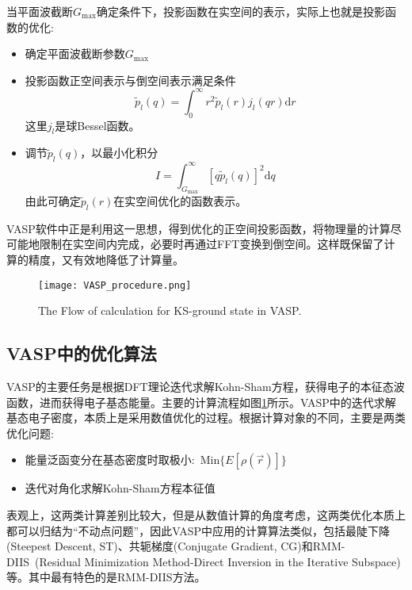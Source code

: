 当平面波截断$G_{\mathrm{max}}$确定条件下，投影函数在实空间的表示，实际上也就是投影函数的优化:~
\begin{itemize}
	\item 确定平面波截断参数$G_{\mathrm{max}}$
	\item 投影函数正空间表示与倒空间表示满足条件
		\begin{equation}
			\tilde p_l(q)=\int_0^{\infty}r^2\tilde p_l(r)j_l(qr)\mathrm{d}r
			\label{eq:projector_G_R}
		\end{equation}
		这里$j_l$是球\textrm{Bessel}函数。
	\item 调节$\tilde p_l(q)$，以最小化积分
		\begin{equation}
			I=\int_{G_{\mathrm{max}}}^{\infty}[q\tilde p_l(q)]^2\mathrm{d}q
			\label{eq:projector_Int}
		\end{equation}
		由此可确定$\tilde p_l(r)$在实空间优化的函数表示。
\end{itemize}
\textrm{VASP}软件中正是利用这一思想，得到优化的正空间投影函数，将物理量的计算尽可能地限制在实空间内完成，必要时再通过\textrm{FFT}变换到倒空间。这样既保留了计算的精度，又有效地降低了计算量。

\begin{figure}[h!]
\centering
\texttt{[image: VASP\_procedure.png]}
\caption{\small \textrm{The Flow of calculation for KS-ground state in VASP.}}%
\label{PAW_procedure}
\end{figure}
\subsection{\rm{VASP}中的优化算法}
\textrm{VASP}的主要任务是根据\textrm{DFT}理论迭代求解\textrm{Kohn-Sham}方程，获得电子的本征态波函数，进而获得电子基态能量。主要的计算流程如图\ref{PAW_procedure}所示。\textrm{VASP}中的迭代求解基态电子密度，本质上是采用数值优化的过程。根据计算对象的不同，主要是两类优化问题:
\begin{itemize}
	\item 能量泛函变分在基态密度时取极小:~$\mathrm{Min}\{E[\rho(\vec r)]\}$
	\item 迭代对角化求解\textrm{Kohn-Sham}方程本征值
\end{itemize}
表观上，这两类计算差别比较大，但是从数值计算的角度考虑，这两类优化本质上都可以归结为“不动点问题”，因此\textrm{VASP}中应用的计算算法类似，包括最陡下降\textrm{(Steepest Descent, ST)}、共轭梯度\textrm{(Conjugate Gradient, CG)}和\textrm{RMM-DIIS~(Residual Minimization Method-Direct Inversion in the Iterative Subspace)}等。其中最有特色的是\textrm{RMM-DIIS}方法。

